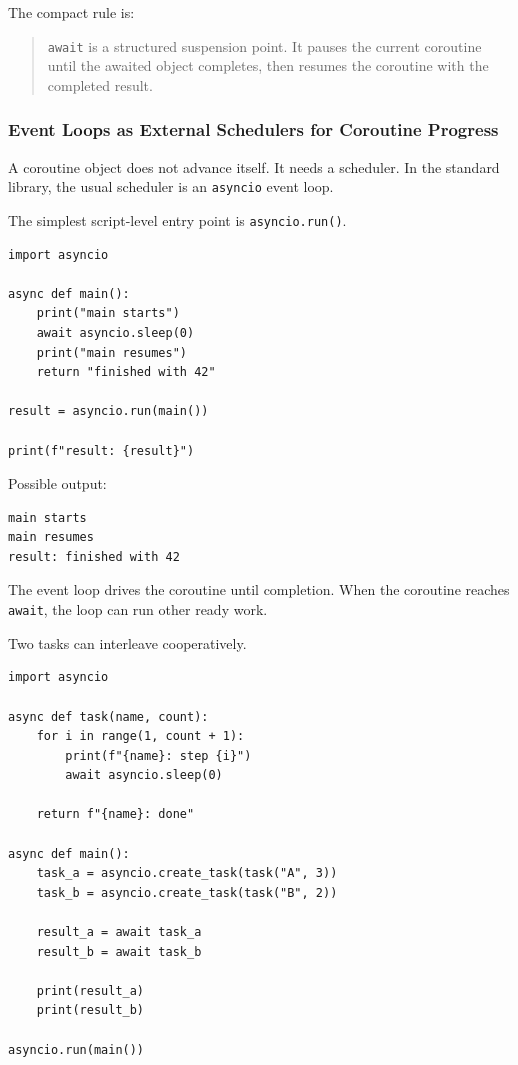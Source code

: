 The compact rule is:

\begin{quote}
\texttt{await} is a structured suspension point. It pauses the current coroutine until the awaited object completes, then resumes the coroutine with the completed result.
\end{quote}

\subsubsection{Event Loops as External Schedulers for Coroutine Progress}

A coroutine object does not advance itself. It needs a scheduler. In the standard library, the usual scheduler is an \texttt{asyncio} event loop.

The simplest script-level entry point is \texttt{asyncio.run()}.

\begin{verbatim}
import asyncio

async def main():
    print("main starts")
    await asyncio.sleep(0)
    print("main resumes")
    return "finished with 42"

result = asyncio.run(main())

print(f"result: {result}")
\end{verbatim}

Possible output:

\begin{verbatim}
main starts
main resumes
result: finished with 42
\end{verbatim}

The event loop drives the coroutine until completion. When the coroutine reaches \texttt{await}, the loop can run other ready work.

Two tasks can interleave cooperatively.

\begin{verbatim}
import asyncio

async def task(name, count):
    for i in range(1, count + 1):
        print(f"{name}: step {i}")
        await asyncio.sleep(0)

    return f"{name}: done"

async def main():
    task_a = asyncio.create_task(task("A", 3))
    task_b = asyncio.create_task(task("B", 2))

    result_a = await task_a
    result_b = await task_b

    print(result_a)
    print(result_b)

asyncio.run(main())
\end{verbatim}

